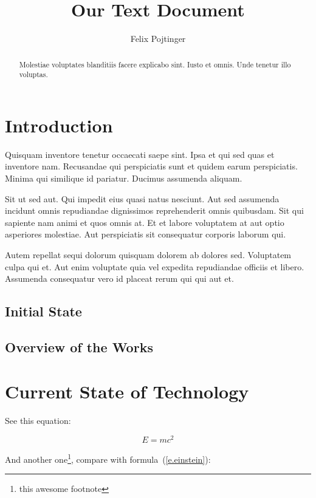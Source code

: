 \documentclass{scrartcl}
\newcommand{\eref}[1]{(\ref{#1})}
\begin{document}
\title{Our Text Document}
\author{Felix Pojtinger}
\date{}
\maketitle

\begin{abstract}
    Molestiae voluptates blanditiis facere explicabo sint. Iusto et omnis. Unde tenetur illo voluptas.
\end{abstract}

\section{Introduction}

Quisquam inventore tenetur occaecati saepe sint. Ipsa et qui sed quas et inventore nam. Recusandae qui perspiciatis sunt et quidem earum perspiciatis. Minima qui similique id pariatur. Ducimus assumenda aliquam.

Sit ut sed aut. Qui impedit eius quasi natus nesciunt. Aut sed assumenda incidunt omnis repudiandae dignissimos reprehenderit omnis quibusdam. Sit qui sapiente nam animi et quos omnis at. Et et labore voluptatem at aut optio asperiores molestiae. Aut perspiciatis sit consequatur corporis laborum qui.

Autem repellat sequi dolorum quisquam dolorem ab dolores sed. Voluptatem culpa qui et. Aut enim voluptate quia vel expedita repudiandae officiis et libero. Assumenda consequatur vero id placeat rerum qui qui aut et.

\subsection{Initial State}
\label{s.initial-state}

\subsection{Overview of the Works}

\section{Current State of Technology}

See this equation:

\begin{equation}
    E=mc^2
    \label{e.einstein}
\end{equation}

And another one\footnote{this awesome footnote}, compare with formula~\eref{e.einstein}:
\end{document}
